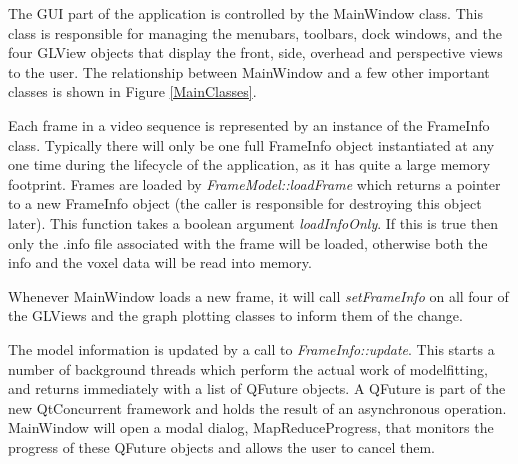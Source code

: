 The GUI part of the application is controlled by the MainWindow class.
This class is responsible for managing the menubars, toolbars, dock windows, and the four GLView objects that display the front, side, overhead and perspective views to the user.
The relationship between MainWindow and a few other important classes is shown in Figure \ref{MainClasses}.

Each frame in a video sequence is represented by an instance of the FrameInfo class.
Typically there will only be one full FrameInfo object instantiated at any one time during the lifecycle of the application, as it has quite a large memory footprint.
Frames are loaded by \emph{FrameModel::loadFrame} which returns a pointer to a new FrameInfo object (the caller is responsible for destroying this object later).
This function takes a boolean argument \emph{loadInfoOnly}.
If this is true then only the .info file associated with the frame will be loaded, otherwise both the info and the voxel data will be read into memory.

Whenever MainWindow loads a new frame, it will call \emph{setFrameInfo} on all four of the GLViews and the graph plotting classes to inform them of the change.

The model information is updated by a call to \emph{FrameInfo::update}.
This starts a number of background threads which perform the actual work of modelfitting, and returns immediately with a list of QFuture objects.
A QFuture is part of the new QtConcurrent framework and holds the result of an asynchronous operation.
MainWindow will open a modal dialog, MapReduceProgress, that monitors the progress of these QFuture objects and allows the user to cancel them.

